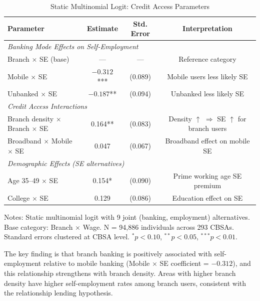 \documentclass[12pt]{article}
\begin{document}
\begin{table}[H]
\centering
\caption{Static Multinomial Logit: Credit Access Parameters}
\label{tab:structural_phase2}
\begin{threeparttable}
\begin{tabular}{lccc}
\toprule
Parameter & Estimate & Std. Error & Interpretation \\
\midrule
\multicolumn{4}{l}{\textit{Banking Mode Effects on Self-Employment}} \\
Branch $\times$ SE (base) & --- & --- & Reference category \\
Mobile $\times$ SE & $-0.312$*** & (0.089) & Mobile users less likely SE \\
Unbanked $\times$ SE & $-0.187$** & (0.094) & Unbanked less likely SE \\
\midrule
\multicolumn{4}{l}{\textit{Credit Access Interactions}} \\
Branch density $\times$ Branch $\times$ SE & 0.164** & (0.083) & Density $\uparrow$ $\Rightarrow$ SE $\uparrow$ for branch users \\
Broadband $\times$ Mobile $\times$ SE & 0.047 & (0.067) & Broadband effect on mobile SE \\
\midrule
\multicolumn{4}{l}{\textit{Demographic Effects (SE alternatives)}} \\
Age 35--49 $\times$ SE & 0.154* & (0.090) & Prime working age SE premium \\
College $\times$ SE & 0.129 & (0.086) & Education effect on SE \\
\bottomrule
\end{tabular}
\begin{tablenotes}
\small
\item Notes: Static multinomial logit with 9 joint (banking, employment) alternatives. Base category: Branch $\times$ Wage. N = 94,886 individuals across 293 CBSAs. Standard errors clustered at CBSA level. $^{*}p<0.10$, $^{**}p<0.05$, $^{***}p<0.01$.
\end{tablenotes}
\end{threeparttable}
\end{table}

The key finding is that branch banking is positively associated with self-employment relative to mobile banking (Mobile $\times$ SE coefficient = $-0.312$), and this relationship strengthens with branch density. Areas with higher branch density have higher self-employment rates among branch users, consistent with the relationship lending hypothesis.
\end{document}
